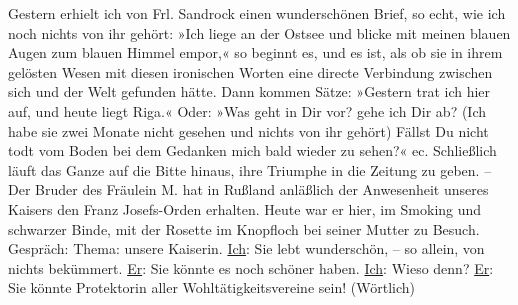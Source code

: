\pstart
           Gestern erhielt ich von Frl. Sandrock einen wunderschönen Brief, so echt, wie ich noch
               nichts von ihr gehört: »Ich liege an der Ostsee
               und blicke mit meinen blauen Augen zum blauen Himmel empor,« so beginnt es, und es
               ist, als ob sie \strikeout{\textcolor{gray}{ih}} in ihrem gelösten Wesen mit diesen ironischen Worten eine directe Verbindung
               zwischen sich und der Welt gefunden hätte. Dann kommen Sätze: »Gestern
               trat ich hier auf, und heute liegt Riga\label{K_L03266-6v}\label{K_L03266-6}.« Oder: »Was geht in Dir vor? gehe ich {\pb}Dir ab? (Ich habe sie zwei
               Monate nicht gesehen und nichts von ihr gehört) Fällst Du nicht todt vom Boden bei
               dem Gedanken mich bald wieder zu sehen?« ec. Schließlich läuft das Ganze auf die
               Bitte hinaus, ihre Triumphe in die Zeitung zu geben. – Der Bruder des Fräulein M. hat in Rußland
               anläßlich der Anwesenheit unseres Kaisers den Franz Josefs-Orden
               erhalten. Heute war er hier, im Smoking und schwarzer
               Binde, mit der Rosette im Knopfloch bei seiner Mutter zu Besuch. Gespräch: Thema: unsere Kaiserin. \uline{Ich}: Sie lebt wunderschön, – so allein, von nichts bekümmert. \uline{Er}: Sie könnte es noch schöner haben. \uline{Ich}: Wieso denn? \uline{Er}:
               Sie könnte Protektorin aller Wohltätigkeitsvereine sein! (Wörtlich)\pend
           
